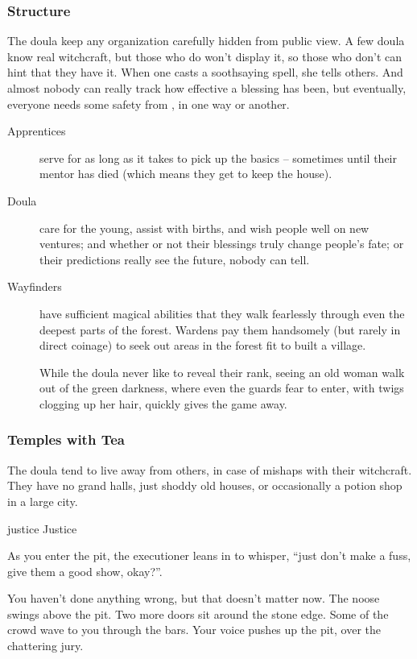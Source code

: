 \begin{multicols}{2}
\subsubsection{Structure}
The doula keep any organization carefully hidden from public view.
A few doula know real witchcraft, but those who do won't display it, so those who don't can hint that they have it.
When one casts a soothsaying spell, she tells others.
And almost nobody can really track how effective a blessing has been, but eventually, everyone needs some safety from \hphantom{Nulla}, in one way or another.

\begin{description}
  \item[Apprentices]
  serve for as long as it takes to pick up the basics -- sometimes until their mentor has died (which means they get to keep the house).
  \item[Doula]
  care for the young, assist with births, and wish people well on new ventures; and whether or not their blessings truly change people's fate; or their predictions really see the future, nobody can tell.
  \item[Wayfinders]
  have sufficient magical abilities that they walk fearlessly through even the deepest parts of the forest.
  Wardens pay them handsomely (but rarely in direct coinage) to seek out areas in the forest fit to built a \gls{village}.

  While the doula never like to reveal their rank, seeing an old woman walk out of the green darkness, where even the \glspl{guard} fear to enter, with twigs clogging up her hair, quickly gives the game away.
\end{description}

\subsubsection{Temples with Tea}
The doula tend to live away from others, in case of mishaps with their witchcraft.
They have no grand halls, just shoddy old houses, or occasionally a potion shop in a large city.

  {\gls{justice}}%
  {Justice}%
  {
    As you enter the pit, the executioner leans in to whisper, ``just don't make a fuss, give them a good show, okay?''.

    You haven't done anything wrong, but that doesn't matter now.
    The noose swings above the pit.
    Two more doors sit around the stone edge.
    Some of the crowd wave to you through the bars.
    Your voice pushes up the pit, over the chattering jury.

}
\end{multicols}
